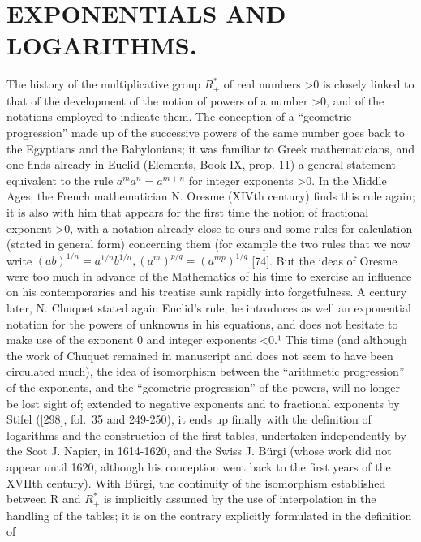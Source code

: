 \chapter{EXPONENTIALS AND LOGARITHMS.}

The history of the multiplicative group \(R_{+}^{*}\) of real numbers \textgreater0 is closely linked to that of the development of the notion of powers of a number \textgreater0, and of the notations employed to indicate them. The conception of a ``geometric progression'' made up of the successive powers of the same number goes back to the Egyptians and the Babylonians; it was familiar to Greek mathematicians, and one finds already in Euclid (Elements, Book IX, prop. 11) a general statement equivalent to the rule \(a^{m}a^{n}=a^{m+n}\) for integer exponents \textgreater0. In the Middle Ages, the French mathematician N. Oresme (XIVth century) finds this rule again; it is also with him that appears for the first time the notion of fractional exponent \textgreater0, with a notation already close to ours and some rules for calculation (stated in general form) concerning them (for example the two rules that we now write \((ab)^{1/n}=a^{1/n}b^{1/n},(a^{m})^{p/q}=(a^{mp})^{1/q}\) {[}74{]}. But the ideas of Oresme were too much in advance of the Mathematics of his time to exercise an influence on his contemporaries and his treatise sunk rapidly into forgetfulness. A century later, N. Chuquet stated again Euclid's rule; he introduces as well an exponential notation for the powers of unknowns in his equations, and does not hesitate to make use of the exponent 0 and integer exponents \textless0.¹ This time (and although the work of Chuquet remained in manuscript and does not seem to have been circulated much), the idea of isomorphism between the ``arithmetic progression'' of the exponents, and the ``geometric progression'' of the powers, will no longer be lost sight of; extended to negative exponents and to fractional exponents by Stifel ({[}298{]}, fol.~35 and 249-250), it ends up finally with the definition of logarithms and the construction of the first tables, undertaken independently by the Scot J. Napier, in 1614-1620, and the Swiss J. Bürgi (whose work did not appear until 1620, although his conception went back to the first years of the XVIIth century). With Bürgi, the continuity of the isomorphism established between R and \(R_{+}^{*}\) is implicitly assumed by the use of interpolation in the handling of the tables; it is on the contrary explicitly formulated in the definition of

